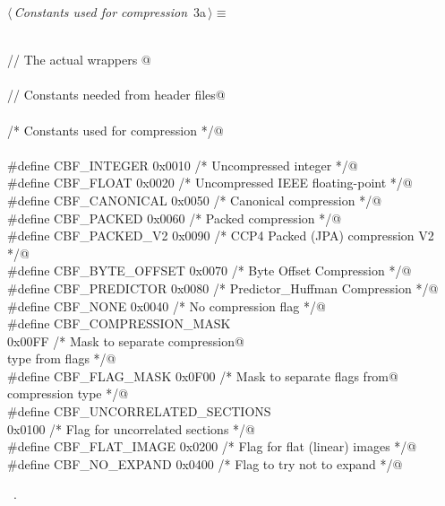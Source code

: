 \documentclass[10pt,a4paper,twoside,notitlepage]{article}
\begin{document}
\begin{flushleft} \small\label{scrap1}\raggedright\small
{} $\langle\,${\itshape Constants used for compression}\nobreak\ {\footnotesize {3a}}$\,\rangle\equiv$
\vspace{-1ex}
\begin{list}{}{} \item
\mbox{}\verb@@\\
\mbox{}\verb@// The actual wrappers @\\
\mbox{}\verb@@\\
\mbox{}\verb@// Constants needed from header files@\\
\mbox{}\verb@@\\
\mbox{}\verb@  /* Constants used for compression */@\\
\mbox{}\verb@@\\
\mbox{}\verb@#define CBF_INTEGER     0x0010  /* Uncompressed integer               */@\\
\mbox{}\verb@#define CBF_FLOAT       0x0020  /* Uncompressed IEEE floating-point   */@\\
\mbox{}\verb@#define CBF_CANONICAL   0x0050  /* Canonical compression              */@\\
\mbox{}\verb@#define CBF_PACKED      0x0060  /* Packed compression                 */@\\
\mbox{}\verb@#define CBF_PACKED_V2   0x0090  /* CCP4 Packed (JPA) compression V2   */@\\
\mbox{}\verb@#define CBF_BYTE_OFFSET 0x0070  /* Byte Offset Compression            */@\\
\mbox{}\verb@#define CBF_PREDICTOR   0x0080  /* Predictor_Huffman Compression      */@\\
\mbox{}\verb@#define CBF_NONE        0x0040  /* No compression flag                */@\\
\mbox{}\verb@#define CBF_COMPRESSION_MASK  \@\\
\mbox{}\verb@                        0x00FF  /* Mask to separate compression@\\
\mbox{}\verb@                                   type from flags              */@\\
\mbox{}\verb@#define CBF_FLAG_MASK   0x0F00  /* Mask to separate flags from@\\
\mbox{}\verb@                                   compression type             */@\\
\mbox{}\verb@#define CBF_UNCORRELATED_SECTIONS \@\\
\mbox{}\verb@                        0x0100  /* Flag for uncorrelated sections     */@\\
\mbox{}\verb@#define CBF_FLAT_IMAGE  0x0200  /* Flag for flat (linear) images      */@\\
\mbox{}\verb@#define CBF_NO_EXPAND   0x0400  /* Flag to try not to expand          */@\\
\mbox{}\verb@@{\NWsep}
\end{list}
\vspace{-1.5ex}
\footnotesize
\begin{list}{}{\setlength{\itemsep}{-\parsep}\setlength{\itemindent}{-\leftmargin}}
\item \NWtxtMacroRefIn\ .


\end{list}
\end{flushleft}
\end{document}
